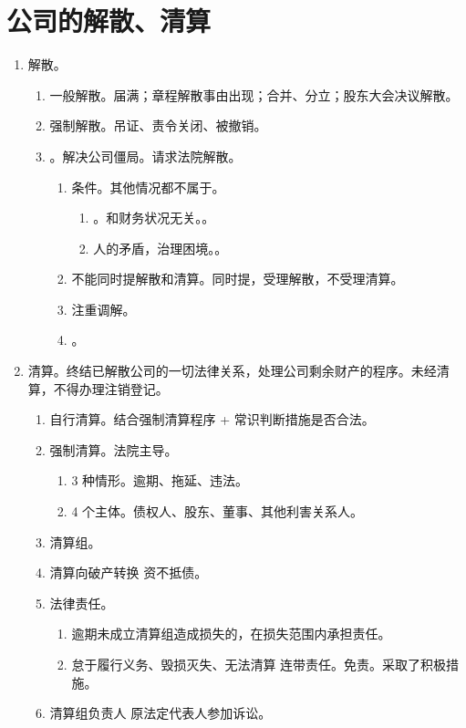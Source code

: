 \section{公司的解散、清算}
\begin{enumerate}
  \item 解散。
        \begin{enumerate}
          \item 一般解散。届满；章程解散事由出现；合并、分立；股东大会决议解散。
          \item 强制解散。吊证、责令关闭、被撤销。
          \item {}。解决公司僵局。请求法院解散。
                \begin{enumerate}
                  \item 条件。其他情况都不属于。
                        \begin{enumerate}
                          \item {}。和财务状况无关。。
                          \item 人的矛盾，治理困境。。
                        \end{enumerate}
                  \item 不能同时提解散和清算。同时提，受理解散，不受理清算。
                  \item 注重调解。
                  \item {}。
                \end{enumerate}
        \end{enumerate}
  \item 清算。终结已解散公司的一切法律关系，处理公司剩余财产的程序。未经清算，不得办理注销登记。
        \begin{enumerate}
          \item 自行清算。结合强制清算程序 + 常识判断措施是否合法。
          \item 强制清算。法院主导。
                \begin{enumerate}
                  \item 3 种情形。逾期、拖延、违法。
                  \item 4 个主体。债权人、股东、董事、其他利害关系人。
                \end{enumerate}
          \item 清算组。
          \item 清算向破产转换 \yjt 资不抵债。
          \item 法律责任。
                \begin{enumerate}
                  \item 逾期未成立清算组造成损失的，在损失范围内承担责任。
                  \item 怠于履行义务、毁损灭失、无法清算 \yjt 连带责任。免责。采取了积极措施。
                \end{enumerate}
          \item 清算组负责人 \hz 原法定代表人参加诉讼。
        \end{enumerate}
\end{enumerate}